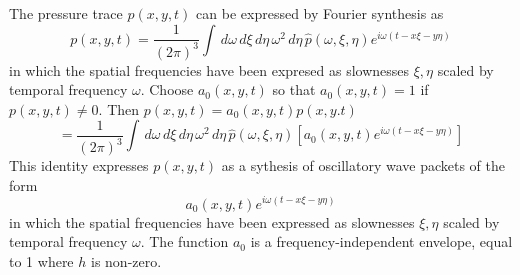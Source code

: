 \documentclass[12pt]{geophysics}
\begin{document}
The pressure trace
$p(x,y,t)$ can be expressed by Fourier synthesis as
\begin{equation}
  \label{eqn:four}
p(x,y,t) = \frac{1}{(2\pi)^3}\int \,d \omega \,d\xi \, d\eta \,\omega^2
\,d\eta\,\hat{p}(\omega,\xi,\eta) e^{i\omega(t-x\xi - y\eta)}
\end{equation}
in which the spatial frequencies have been expresed as slownesses
$\xi,\eta$ scaled by temporal frequency $\omega$.
Choose $a_0(x,y,t)$ so that $a_0(x,y,t) = 1$ if $p(x,y,t) \ne 0$. Then
$p(x,y,t) = a_0(x,y,t)p(x,y.t)$
\begin{equation}
  \label{eqn:fourloc}
=\frac{1}{(2\pi)^3}\int \,d\omega \, d\xi \, d\eta \, \omega^2
\,d\eta\,\hat{p}(\omega,\xi,\eta) [a_0(x,y,t) e^{i\omega(t-x\xi -
  y\eta)}]
\end{equation}
This identity expresses $p(x,y,t)$ as a sythesis of
oscillatory wave packets of the form
\begin{equation}
  \label{eqn:pwp}
 a_0(x,y,t) e^{i\omega(t-x\xi-y\eta)}
\end{equation}
in which the spatial frequencies have been expressed as slownesses
$\xi,\eta$ scaled by temporal frequency $\omega$. The function $a_0$
is a frequency-independent envelope, equal to 1 where $h$ is
non-zero.
\end{document}
